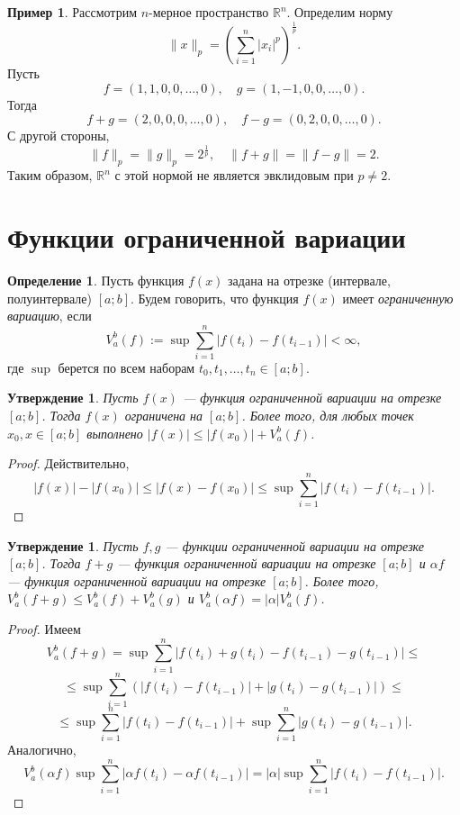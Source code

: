 \documentclass[12pt, titlepage, oneside]{amsbook}
\newcommand{\RR}{\mathbb{R}}
\newtheorem{claim}[theorem]{Утверждение}
\theoremstyle{definition}
\newtheorem{example}[theorem]{Пример}
\newtheorem{definition}[theorem]{Определение}
\theoremstyle{remark}
\begin{document}
\begin{example}
Рассмотрим $n$-мерное пространство $\RR^n$. Определим норму $$\|x\|_p=\left(\sum\limits_{i=1}^n|x_i|^p\right)^{\frac{1}{p}}.$$ Пусть $$f=(1,1,0,0,\ldots,0),\quad g=(1,-1,0,0,\ldots,0).$$ Тогда $$f+g=(2,0,0,0,\ldots,0),\quad f-g=(0,2,0,0,\ldots,0).$$ С другой стороны, $$\|f\|_p=\|g\|_p=2^{\frac{1}{p}},\quad \|f+g\|=\|f-g\|=2.$$ Таким образом, $\RR^n$ с этой нормой не является эвклидовым при $p\neq 2$.
\end{example}

\section{Функции ограниченной вариации}

 \begin{definition}
Пусть функция $f(x)$ задана на отрезке (интервале, полуинтервале) $[a;b]$. Будем говорить, что функция $f(x)$ имеет \emph{ограниченную вариацию}, если $$V_a^b(f):=\sup\sum\limits_{i=1}^n|f(t_i)-f(t_{i-1})|<\infty,$$ где $\sup$ берется по всем наборам $t_0,t_1,\ldots,t_n\in[a;b]$.
\end{definition}

\begin{claim}
\label{Var1} Пусть $f(x)$ --- функция ограниченной вариации на отрезке $[a;b]$. Тогда $f(x)$ ограничена на $[a;b]$. Более того, для любых точек $x_0,x\in [a;b]$ выполнено $|f(x)|\leq |f(x_0)|+V_a^b(f)$.
\end{claim}

\begin{proof}
Действительно, $$|f(x)|-|f(x_0)|\leq |f(x)-f(x_0)|\leq \sup\sum\limits_{i=1}^n|f(t_i)-f(t_{i-1})|.$$
\end{proof}

\begin{claim}
\label{Var2}
Пусть $f,g$ --- функции ограниченной вариации на отрезке $[a;b]$. Тогда $f+g$ --- функция ограниченной вариации на отрезке $[a;b]$ и $\alpha f$ --- функция ограниченной вариации на отрезке $[a;b]$. Более того, $V_a^b(f+g)\leq V_a^b(f)+V_a^b(g)$ и $V_a^b(\alpha f)=|\alpha|V_a^b(f)$.
\end{claim}

\begin{proof}
Имеем $$V_a^b(f+g)=\sup\sum\limits_{i=1}^n|f(t_i)+g(t_i)-f(t_{i-1})-g(t_{i-1})|\leq $$ $$\leq\sup\sum\limits_{i=1}^n(|f(t_i)-f(t_{i-1})|+|g(t_i)-g(t_{i-1})|)\leq $$ $$\leq\sup\sum\limits_{i=1}^n|f(t_i)-f(t_{i-1})|+\sup\sum\limits_{i=1}^n|g(t_i)-g(t_{i-1})|.$$ Аналогично, $$V_a^b(\alpha f)\sup\sum\limits_{i=1}^n|\alpha f(t_i)-\alpha f(t_{i-1})|=|\alpha|\sup\sum\limits_{i=1}^n|f(t_i)-f(t_{i-1})|.$$
\end{proof}
\end{document}
